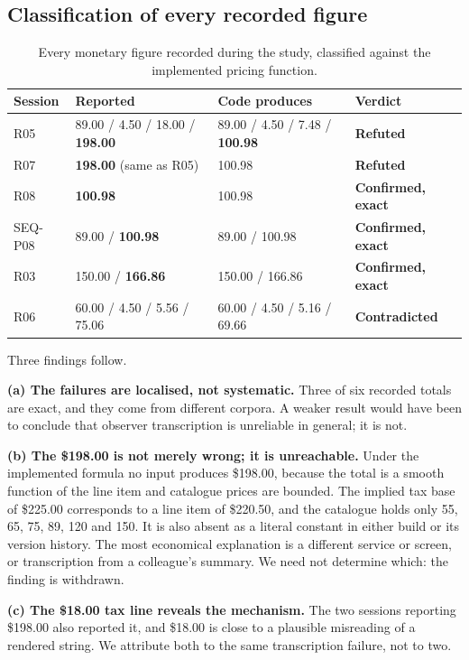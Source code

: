 \documentclass[conference]{IEEEtran}
\begin{document}
\subsection{Classification of every recorded figure}

\begin{table}[h]
\caption{Every monetary figure recorded during the study, classified against the implemented pricing
function.}
\label{tab:classification}
\centering
\begin{tabular}{@{}llll@{}}
\toprule
Session & Reported & Code produces & Verdict \\
\midrule
R05 & 89.00 / 4.50 / 18.00 / \textbf{198.00} & 89.00 / 4.50 / 7.48 / \textbf{100.98} & \textbf{Refuted} \\
R07 & \textbf{198.00} (same as R05) & 100.98 & \textbf{Refuted} \\
R08 & \textbf{100.98} & 100.98 & \textbf{Confirmed, exact} \\
SEQ-P08 & 89.00 / \textbf{100.98} & 89.00 / 100.98 & \textbf{Confirmed, exact} \\
R03 & 150.00 / \textbf{166.86} & 150.00 / 166.86 & \textbf{Confirmed, exact} \\
R06 & 60.00 / 4.50 / 5.56 / 75.06 & 60.00 / 4.50 / 5.16 / 69.66 & \textbf{Contradicted} \\
\bottomrule
\end{tabular}
\end{table}

Three findings follow.

\textbf{(a) The failures are localised, not systematic.} Three of six recorded totals are exact, and
they come from different corpora. A weaker result would have been to conclude that observer
transcription is unreliable in general; it is not.

\textbf{(b) The \$198.00 is not merely wrong; it is unreachable.} Under the implemented formula no
input produces \$198.00, because the total is a smooth function of the line item and catalogue prices
are bounded. The implied tax base of \$225.00 corresponds to a line item of \$220.50, and the catalogue
holds only 55, 65, 75, 89, 120 and 150. It is also absent as a literal constant in either build or its
version history. The most economical explanation is a different service or screen, or transcription
from a colleague's summary. We need not determine which: the finding is withdrawn.

\textbf{(c) The \$18.00 tax line reveals the mechanism.} The two sessions reporting \$198.00 also
reported it, and \$18.00 is close to a plausible misreading of a rendered string. We attribute both to
the same transcription failure, not to two.
\end{document}
